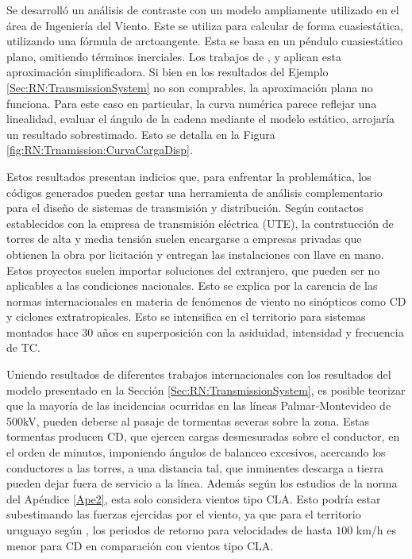 Se desarrolló un análisis de contraste con un modelo ampliamente utilizado en el área de Ingeniería del Viento. Este se utiliza para calcular de forma cuasiestática, utilizando una fórmula de arctoangente. Esta se basa en un péndulo cuasiestático plano, omitiendo términos inerciales. Los trabajos de \cite{stengel2017measurements}, \cite{duranona2009analysis} y \cite{yan2009numerical} aplican esta aproximación simplificadora. Si bien en los resultados del Ejemplo \ref{Sec:RN:TransmissionSystem} no son comprables, la aproximación plana no funciona. Para este caso en particular, la curva numérica parece reflejar una linealidad, evaluar el ángulo de la cadena mediante el modelo estático, arrojaría un resultado sobrestimado. Esto se detalla en la Figura \ref{fig:RN:Trnamission:CurvaCargaDisp}.

Estos resultados presentan indicios que, para enfrentar la problemática, los códigos generados pueden gestar una herramienta de análisis complementario para el diseño de sistemas de transmisión y distribución. Según contactos establecidos con la empresa de transmisión eléctrica (UTE), la contrstucción de torres de alta y media tensión suelen encargarse a empresas privadas que obtienen la obra por licitación y entregan las instalaciones con llave en mano. Estos proyectos suelen importar soluciones del extranjero, que pueden ser no aplicables a las condiciones nacionales. Esto se explica por la carencia de las normas internacionales en materia de fenómenos de viento no sinópticos como CD y ciclones extratropicales. Esto se intensifica en el territorio para sistemas montados hace 30 años en superposición con la asiduidad, intensidad y frecuencia de TC. 

Uniendo resultados de diferentes trabajos internacionales con los resultados del modelo presentado en la Sección \ref{Sec:RN:TransmissionSystem}, es posible teorizar que la mayoría de las incidencias ocurridas en las líneas Palmar-Montevideo de 500kV, pueden deberse al pasaje de tormentas severas sobre la zona. Estas tormentas producen CD, que ejercen cargas desmesuradas sobre el conductor, en el orden de minutos, imponiendo ángulos de balanceo excesivos, acercando los conductores a las torres, a una distancia tal, que inminentes descarga a tierra pueden dejar fuera de servicio a la línea. Además según los estudios de la norma \cite{IEC60826} del Apéndice \ref{Ape2}, esta solo considera vientos tipo CLA. Esto podría estar subestimando las fuerzas ejercidas por el viento, ya que para el territorio uruguayo según \cite{Duranona2018}, los periodos de retorno para velocidades de hasta $100$ km/h es menor para CD en comparación con vientos tipo CLA. 




